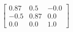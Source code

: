 \documentclass[preview]{standalone}
\begin{document}
\begin{align*}
\left[ \begin{array}{ccc}0.87 & 0.5 & -0.0 \\ -0.5 & 0.87 & 0.0 \\ 0.0 & 0.0 & 1.0\end{array} \right]
\end{align*}
\end{document}
